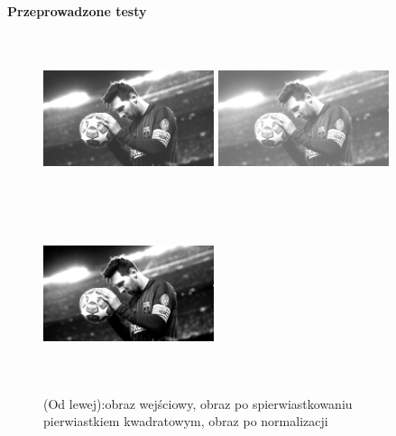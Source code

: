 \documentclass[magisterska,openany]{pracadypl}
\begin{document}
\vspace{0.25cm}\textbf{\Large Przeprowadzone testy}
\vspace{0.5cm}
\begin{figure}[h]
\centering
\includegraphics[width=5cm, height=5cm]{orgi/gMessi.jpg}
\includegraphics[width=5cm, height=5cm]{3_9/rootG1.jpg}
\includegraphics[width=5cm, height=5cm]{3_9/nrootG1.jpg}
\caption{(Od lewej):obraz wejściowy, obraz po spierwiastkowaniu pierwiastkiem kwadratowym, obraz po normalizacji}
\end{figure}
\end{document}
